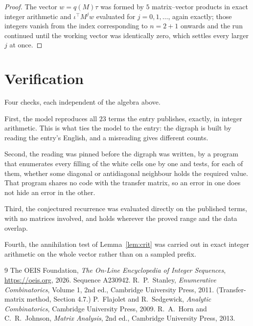 \documentclass[11pt,a4paper]{article}
\theoremstyle{plain}
\theoremstyle{definition}
\begin{document}
\begin{proof}
The vector $w=q(M)\tau$ was formed by $5$ matrix--vector products in exact integer
arithmetic and $\iota^{\!\top}M^{j}w$ evaluated for $j=0,1,\dots$, again exactly; those
integers vanish from the index corresponding to $n=2+1$ onwards and the run continued
until the working vector was identically zero, which settles every larger $j$ at once.
\end{proof}

\section{Verification}

Four checks, each independent of the algebra above.

First, the model reproduces all $23$ terms the entry publishes, exactly, in integer
arithmetic. This is what ties the model to the entry: the digraph is built by reading the
entry's English, and a misreading gives different counts.

Second, the reading was pinned before the digraph was written, by a program that enumerates
every filling of the white cells one by one and tests, for each of them, whether some
diagonal or antidiagonal neighbour holds the required value. That program shares no code with the transfer matrix, so an error in one does not
hide an error in the other.

Third, the conjectured recurrence was evaluated directly on the published terms, with no
matrices involved, and holds wherever the proved range and the data overlap.

Fourth, the annihilation test of Lemma~\ref{lem:crit} was carried out in exact integer
arithmetic on the whole vector rather than on a sampled prefix.

\begin{thebibliography}{9}
 The OEIS Foundation, \emph{The On-Line Encyclopedia of Integer
Sequences}, \url{https://oeis.org}, 2026. Sequence A230942.
 R.~P.~Stanley, \emph{Enumerative Combinatorics}, Volume 1, 2nd ed.,
Cambridge University Press, 2011. (Transfer-matrix method, Section 4.7.)
 P.~Flajolet and R.~Sedgewick, \emph{Analytic Combinatorics}, Cambridge
University Press, 2009.
 R.~A.~Horn and C.~R.~Johnson, \emph{Matrix Analysis}, 2nd ed., Cambridge
University Press, 2013.
\end{thebibliography}
\end{document}
